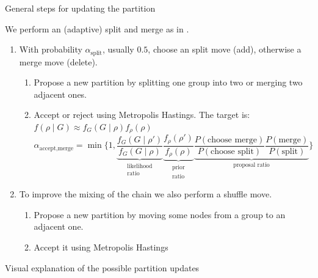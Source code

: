 \begin{frame}{General steps for updating the partition}
    
    We perform an (adaptive) \alert{split and merge} as in \cite{bensonAdaptiveMCMCMultiple2018}.
    \begin{enumerate}
        \item With probability $\alpha_{\text{split}}$, usually $0.5$, choose an \alert{split move (add)}, otherwise a \alert{merge move (delete)}.
        \begin{enumerate}
            \item Propose a new partition by splitting one group into two or merging two adjacent ones.
            \item Accept or reject using Metropolis Hastings. The target is:
            $f(\rho \mid G) \approx f_G(G \mid \rho) f_{\rho}(\rho)$
            \[
                \alpha_{\text{accept,merge}} = \min %
                \bigg\{1,
                \underbrace{\frac{f_G\left(G \mid \rho'\right)}{f_G(G \mid \rho)}}_{\substack{\text{likelihood}\\\text{ratio}}}
                \underbrace{\frac{f_\rho\left(\rho'\right)}{f_\rho(\rho)}}_{\substack{\text{prior}\\\text{ratio}}}
                \underbrace{\frac{P(\text{choose merge})}{P(\text{choose split})} \frac{P(\text{merge})}{P(\text{split})}}_{\text{proposal ratio}}
                \bigg\}
            \]
        \end{enumerate}
        \item To improve the mixing of the chain we also perform a \alert{shuffle move}.
        \begin{enumerate}
            \item Propose a new partition by moving some nodes from a group to an adjacent one.
            \item Accept it using Metropolis Hastings
        \end{enumerate}

    \end{enumerate}

\end{frame}

\begin{frame}{Visual explanation of the possible partition updates}
\end{frame}








